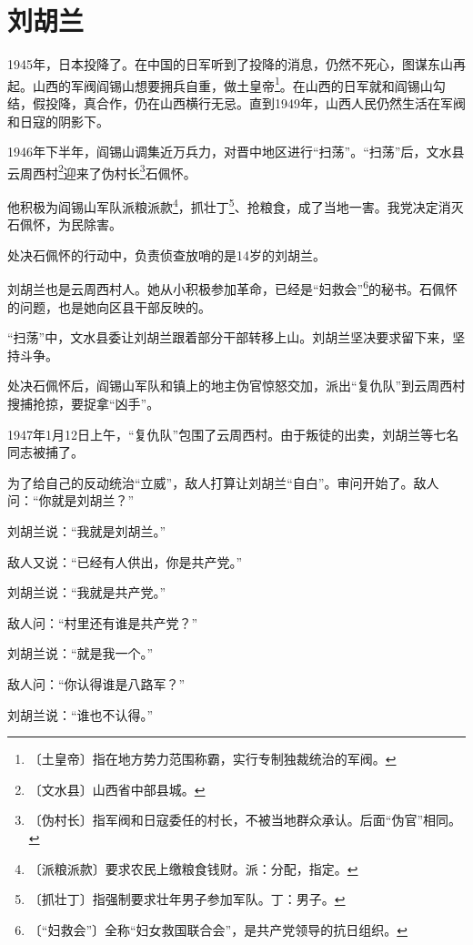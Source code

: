 \documentclass[12pt,UTF-8,openany]{ctexbook}
\begin{document}
\chapter{刘胡兰}

\begin{large}
    
    1945年，日本投降了。在中国的日军听到了投降的消息，仍然不死心，图谋东山再起。山西的军阀阎锡山想要拥兵自重，做土皇帝\footnote{〔土皇帝〕指在地方势力范围称霸，实行专制独裁统治的军阀。}。在山西的日军就和阎锡山勾结，假投降，真合作，仍在山西横行无忌。直到1949年，山西人民仍然生活在军阀和日寇的阴影下。
    
    1946年下半年，阎锡山调集近万兵力，对晋中地区进行“扫荡”。“扫荡”后，文水县云周西村\footnote{〔文水县〕山西省中部县城。}迎来了伪村长\footnote{〔伪村长〕指军阀和日寇委任的村长，不被当地群众承认。后面“伪官”相同。}石佩怀。
    
    他积极为阎锡山军队派粮派款\footnote{〔派粮派款〕要求农民上缴粮食钱财。派：分配，指定。}，抓壮丁\footnote{〔抓壮丁〕指强制要求壮年男子参加军队。丁：男子。}、抢粮食，成了当地一害。我党决定消灭石佩怀，为民除害。
    
    处决石佩怀的行动中，负责侦查放哨的是14岁的刘胡兰。
    
    刘胡兰也是云周西村人。她从小积极参加革命，已经是“妇救会”\footnote{〔“妇救会”〕全称“妇女救国联合会”，是共产党领导的抗日组织。}的秘书。石佩怀的问题，也是她向区县干部反映的。
    
    “扫荡”中，文水县委让刘胡兰跟着部分干部转移上山。刘胡兰坚决要求留下来，坚持斗争。
    
    处决石佩怀后，阎锡山军队和镇上的地主伪官惊怒交加，派出“复仇队”到云周西村搜捕抢掠，要捉拿“凶手”。
    
    1947年1月12日上午，“复仇队”包围了云周西村。由于叛徒的出卖，刘胡兰等七名同志被捕了。
    
    为了给自己的反动统治“立威”，敌人打算让刘胡兰“自白”。审问开始了。敌人问：“你就是刘胡兰？”
    
    刘胡兰说：“我就是刘胡兰。”
    
    敌人又说：“已经有人供出，你是共产党。”
    
    刘胡兰说：“我就是共产党。”
    
    敌人问：“村里还有谁是共产党？”
    
    刘胡兰说：“就是我一个。”
    
    敌人问：“你认得谁是八路军？”
    
    刘胡兰说：“谁也不认得。”
    

\end{large}
\end{document}
